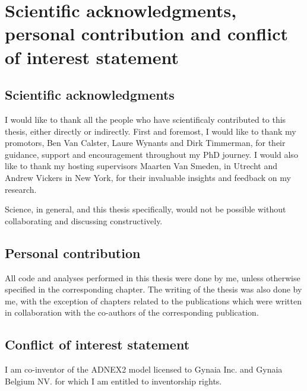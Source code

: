 \chapter*{Scientific acknowledgments, personal contribution and conflict of interest statement}

\section*{Scientific acknowledgments}

I would like to thank all the people who have scientificaly contributed to this thesis, either directly or indirectly. First and foremost, I would like to thank my promotors, Ben Van Calster, Laure Wynants and Dirk Timmerman, for their guidance, support and encouragement throughout my PhD journey. I would also like to thank my hosting supervisors Maarten Van Smeden, in Utrecht and Andrew Vickers in New York, for their invaluable insights and feedback on my research. 

Science, in general, and this thesis specifically, would not be possible without collaborating and discussing constructively. 

\section*{Personal contribution}

All code and analyses performed in this thesis were done by me, unless otherwise specified in the corresponding chapter. The writing of the thesis was also done by me, with the exception of chapters related to the publications which were written in collaboration with the co-authors of the corresponding publication. 

\section*{Conflict of interest statement}

I am co-inventor of the ADNEX2 model licensed to Gynaia Inc. and Gynaia Belgium NV. for which I am entitled to inventorship rights. 